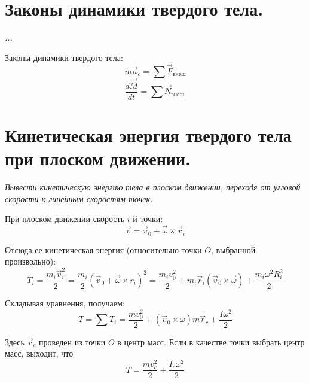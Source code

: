 \documentclass{article}
\begin{document}
    \section{Законы динамики твердого тела.}
    \par
      \textit{...}\\
    \par     
      Законы динамики твердого тела:
      \begin{equation}
	m\vec a_c=\sum\vec F_\text{внеш}
      \end{equation}
      \begin{equation}
	\frac{d\vec M}{dt}=\sum\vec N_\text{внеш.}
      \end{equation}
  \clearpage
    
    \section{Кинетическая энергия твердого тела при плоском движении.}
    \par
      \textit{Вывести кинетическую энергию тела в плоском движении, переходя от угловой скорости к линейным скоростям точек.}\\
    \par 
      При плоском движении скорость $i$-й точки:
      \begin{equation}
	\vec v=\vec v_0+\vec\omega\times\vec r_i
      \end{equation}
    \par
      Отсюда ее кинетическая энергия (относительно точки $O$, выбранной произвольно):
      \begin{equation}
	T_i=\frac{m_i\vec v_i^2}{2}=\frac{m_i}{2}(\vec v_0+\vec\omega\times r_i)^2=\frac{m_iv_0^2}{2}+m_i\vec r_i(\vec v_0\times \vec\omega)+\frac{m_i\omega^2R_i^2}{2}
      \end{equation}
    \par
      Складывая уравнения, получаем:
      \begin{equation}
	T=\sum T_i=\frac{mv_0^2}{2}+(\vec v_0\times\omega)m\vec r_c+\frac{I\omega^2}{2}
      \end{equation}
    \par
      Здесь $\vec r_c$ проведен из точки $O$ в центр масс. Если в качестве точки выбрать центр масс, выходит, что
      \begin{equation}
	T=\frac{mv_c^2}{2}+\frac{I_c\omega^2}{2}
      \end{equation}
  \clearpage
    
\end{document}
